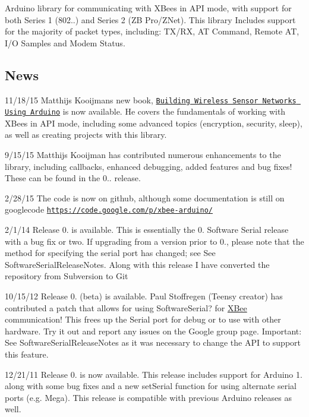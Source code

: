 Arduino library for communicating with X\+Bees in A\+PI mode, with support for both Series 1 (802..) and Series 2 (ZB Pro/\+Z\+Net). This library Includes support for the majority of packet types, including\+: T\+X/\+RX, AT Command, Remote AT, I/O Samples and Modem Status.

\subsection*{News}


\begin{DoxyItemize}
\item 11/18/15 Matthijs Kooijman\textquotesingle{}s new book, \href{http://www.amazon.com/gp/product/1784395587/ref=as_li_tl?ie=UTF8&camp=1789&creative=9325&creativeASIN=1784395587&linkCode=as2&tag=xbapra-20&linkId=CEH23GT6ZPOT4ZH4}{\tt Building Wireless Sensor Networks Using Arduino} is now available. He covers the fundamentals of working with X\+Bees in A\+PI mode, including some advanced topics (encryption, security, sleep), as well as creating projects with this library.
\item 9/15/15 Matthijs Kooijman has contributed numerous enhancements to the library, including callbacks, enhanced debugging, added features and bug fixes! These can be found in the 0.. release.
\item 2/28/15 The code is now on github, although some documentation is still on googlecode \href{https://code.google.com/p/xbee-arduino/}{\tt https\+://code.\+google.\+com/p/xbee-\/arduino/}
\item 2/1/14 Release 0. is available. This is essentially the 0. Software Serial release with a bug fix or two. If upgrading from a version prior to 0., please note that the method for specifying the serial port has changed; see See Software\+Serial\+Release\+Notes. Along with this release I have converted the repository from Subversion to Git
\item 10/15/12 Release 0. (beta) is available. Paul Stoffregen (Teensy creator) has contributed a patch that allows for using Software\+Serial? for \hyperlink{class_x_bee}{X\+Bee} communication! This frees up the Serial port for debug or to use with other hardware. Try it out and report any issues on the Google group page. Important\+: See Software\+Serial\+Release\+Notes as it was necessary to change the A\+PI to support this feature.
\item 12/21/11 Release 0. is now available. This release includes support for Arduino 1. along with some bug fixes and a new set\+Serial function for using alternate serial ports (e.\+g. Mega). This release is compatible with previous Arduino releases as well.

\end{DoxyItemize}
